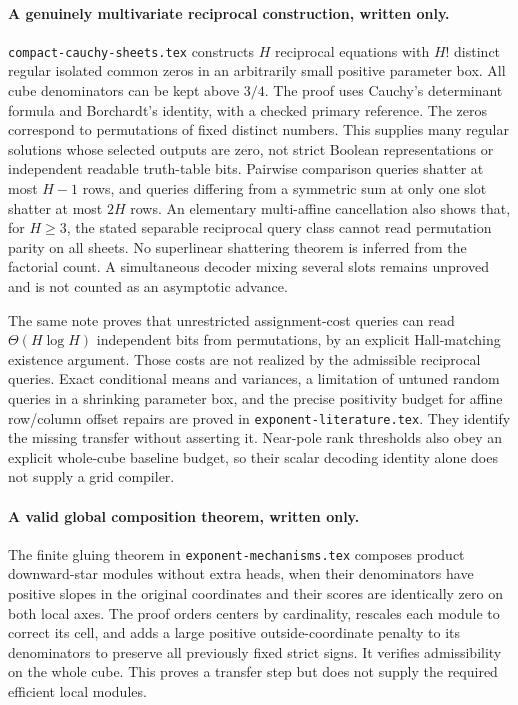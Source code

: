 \documentclass[11pt]{article}
\begin{document}
\paragraph{A genuinely multivariate reciprocal construction, written only.}
\texttt{compact-cauchy-sheets.tex} constructs $H$ reciprocal equations
with $H!$ distinct regular isolated common zeros in an arbitrarily
small positive parameter box. All cube denominators can be kept above
$3/4$. The proof uses Cauchy's determinant formula and Borchardt's
identity, with a checked primary reference. The zeros correspond to
permutations of fixed distinct numbers. This supplies many regular
solutions whose selected outputs are zero, not strict Boolean
representations or independent readable truth-table bits. Pairwise
comparison queries shatter at most $H-1$ rows, and queries differing
from a symmetric sum at only one slot shatter at most $2H$ rows.
An elementary multi-affine cancellation also shows that, for $H\ge3$,
the stated separable reciprocal query class cannot read permutation
parity on all sheets. No superlinear shattering theorem is inferred
from the factorial count. A simultaneous decoder mixing several slots
remains unproved and is not counted as an asymptotic advance.

The same note proves that unrestricted assignment-cost queries can
read $\Theta(H\log H)$ independent bits from permutations, by an
explicit Hall-matching existence argument. Those costs are not
realized by the admissible reciprocal queries. Exact conditional
means and variances, a limitation of untuned random queries in a
shrinking parameter box, and the precise positivity budget for
affine row/column offset repairs are proved in
\texttt{exponent-literature.tex}. They identify the missing transfer
without asserting it. Near-pole rank thresholds also obey an explicit
whole-cube baseline budget, so their scalar decoding identity alone
does not supply a grid compiler.

\paragraph{A valid global composition theorem, written only.}
The finite gluing theorem in \texttt{exponent-mechanisms.tex}
composes product downward-star modules without extra heads, when
their denominators have positive slopes in the original coordinates
and their scores are identically zero on both local axes. The proof orders
centers by cardinality, rescales each module to correct its cell,
and adds a large positive outside-coordinate penalty to its
denominators to preserve all previously fixed strict signs. It
verifies admissibility on the whole cube. This proves a transfer
step but does not supply the required efficient local modules.
\end{document}
